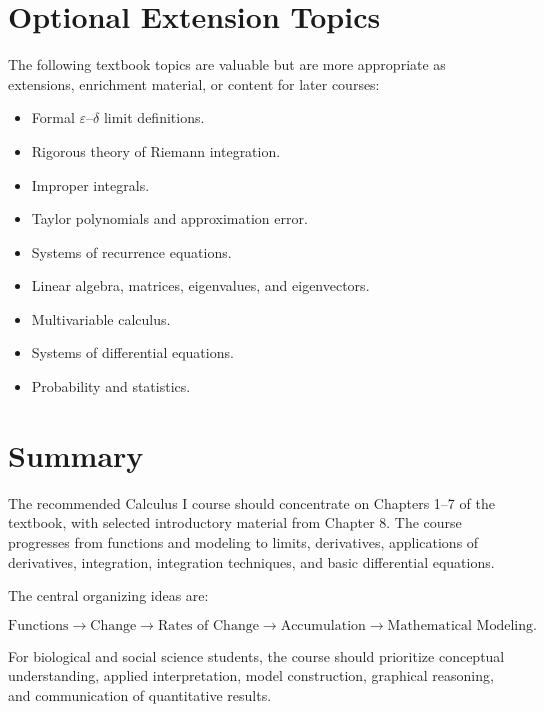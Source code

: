 \documentclass[11pt]{article}
\begin{document}
\section{Optional Extension Topics}

The following textbook topics are valuable but are more appropriate as extensions, enrichment material, or content for later courses:

\begin{itemize}
    \item Formal \(\varepsilon\)--\(\delta\) limit definitions.
    \item Rigorous theory of Riemann integration.
    \item Improper integrals.
    \item Taylor polynomials and approximation error.
    \item Systems of recurrence equations.
    \item Linear algebra, matrices, eigenvalues, and eigenvectors.
    \item Multivariable calculus.
    \item Systems of differential equations.
    \item Probability and statistics.
\end{itemize}

\section{Summary}

The recommended Calculus I course should concentrate on Chapters 1--7 of the textbook, with selected introductory material from Chapter 8. The course progresses from functions and modeling to limits, derivatives, applications of derivatives, integration, integration techniques, and basic differential equations.

The central organizing ideas are:

\[
\text{Functions}
\rightarrow
\text{Change}
\rightarrow
\text{Rates of Change}
\rightarrow
\text{Accumulation}
\rightarrow
\text{Mathematical Modeling}.
\]

For biological and social science students, the course should prioritize conceptual understanding, applied interpretation, model construction, graphical reasoning, and communication of quantitative results.
\end{document}
